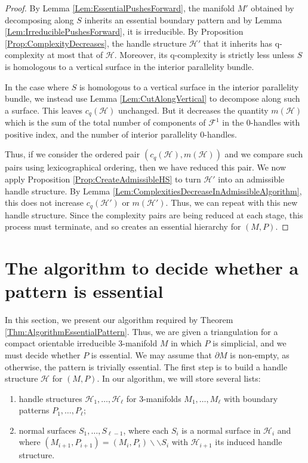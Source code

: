 \documentclass[oneside]{amsart}
\numberwithin{equation}{section}
\theoremstyle{plain}
\theoremstyle{definition}
\newcommand{\cut}{\backslash\backslash}
\begin{document}
\begin{proof}
By Lemma \ref{Lem:EssentialPushesForward}, the manifold $M'$ obtained by decomposing along $S$ inherits an essential boundary pattern and by Lemma \ref{Lem:IrreduciblePushesForward}, it is irreducible. By Proposition \ref{Prop:ComplexityDecreases}, the handle structure $\mathcal{H}'$ that it inherits has q-complexity at most that of $\mathcal{H}$. Moreover, its q-complexity is strictly less unless $S$ is homologous to a vertical surface in the interior parallelity bundle. 

In the case where $S$ is homologous to a vertical surface in the interior parallelity bundle, we instead use Lemma \ref{Lem:CutAlongVertical} to decompose along such a surface. This leaves $c_q(\mathcal{H})$ unchanged. But it decreases the quantity $m(\mathcal{H})$ which is the sum of the total number of components of $\mathcal{F}^1$ in the 0-handles with positive index, and the number of interior parallelity 0-handles.

Thus, if we consider the ordered pair $(c_q(\mathcal{H}), m(\mathcal{H}))$
and we compare such pairs using lexicographical ordering, then we have reduced this pair. We now apply Proposition \ref{Prop:CreateAdmissibleHS} to turn $\mathcal{H}'$ into an admissible handle structure. By Lemma \ref{Lem:ComplexitiesDecreaseInAdmissibleAlgorithm}, this does not increase $c_q(\mathcal{H}')$ or $m(\mathcal{H}')$. Thus, we can repeat with this new handle structure. Since the complexity pairs are being reduced at each stage, this process must terminate, and so creates an essential hierarchy for $(M,P)$.
\end{proof}




\section{The algorithm to decide whether a pattern is essential}
\label{Sec:AlgorithmCompressible}

In this section, we present our algorithm required by Theorem \ref{Thm:AlgorithmEssentialPattern}. Thus, we are given a triangulation for a compact orientable irreducible 3-manifold $M$ in which $P$ is simplicial, and we must decide whether $P$ is essential. We may assume that $\partial M$ is non-empty, as otherwise, the pattern is trivially essential. The first step is to build a handle structure $\mathcal{H}$ for $(M,P)$. In our algorithm, we will store several lists:
\begin{enumerate}
\item handle structures $\mathcal{ H}_1, \dots, \mathcal{ H}_\ell$ for 3-manifolds $M_1, \dots, M_\ell$ with boundary patterns $P_1 ,\dots, P_\ell$;
\item normal surfaces $S_1, \dots, S_{\ell-1}$, where each $S_i$ is a normal surface in $\mathcal{ H}_i$ and where $(M_{i+1}, P_{i+1}) = 
(M_i, P_i) \cut S_i$ with $\mathcal{ H}_{i+1}$ its induced handle structure.
\end{enumerate}
\end{document}
